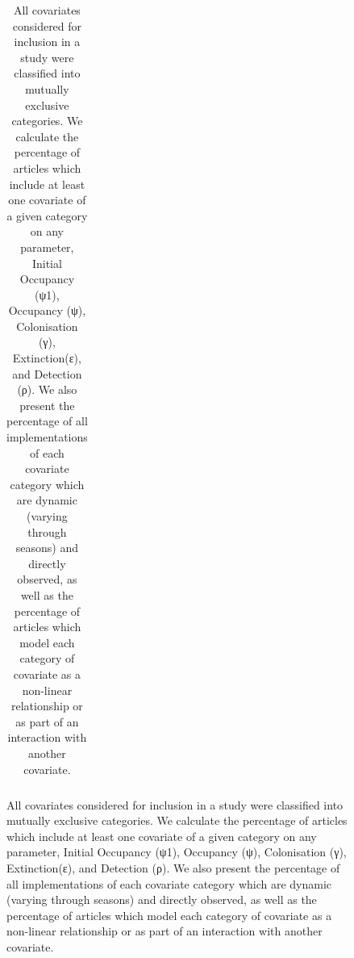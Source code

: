 \documentclass[
]{article}
\begin{document}
\begin{figure}

\begin{longtable}[]{@{}llrrrrrrrrrr@{}}

\caption{\label{tbl-covariates}All covariates considered for inclusion
in a study were classified into mutually exclusive categories. We
calculate the percentage of articles which include at least one
covariate of a given category on any parameter, Initial Occupancy (ψ1),
Occupancy (ψ), Colonisation (γ), Extinction(ε), and Detection (ρ). We
also present the percentage of all implementations of each covariate
category which are dynamic (varying through seasons) and directly
observed, as well as the percentage of articles which model each
category of covariate as a non-linear relationship or as part of an
interaction with another covariate.}

\tabularnewline


\end{longtable}
\end{figure}
\end{document}
